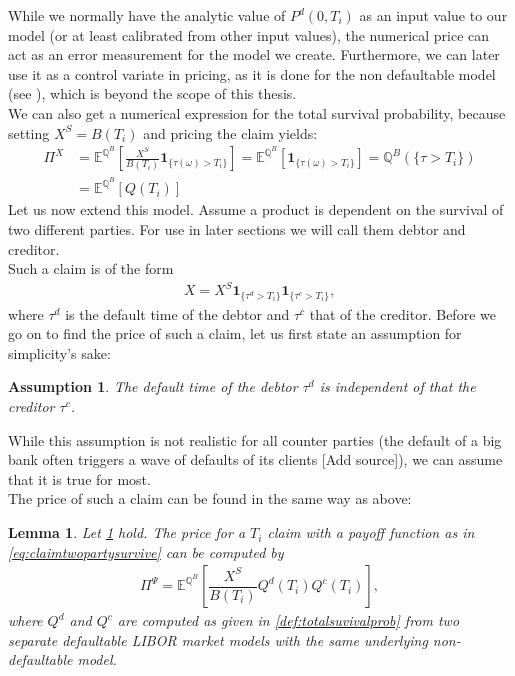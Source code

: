 \documentclass[12pt]{article}
\newtheorem{assumption}{Assumption}[section]
\newtheorem{lemma}[theorem]{Lemma}
\begin{document}
	While we normally have the analytic value of $P^d(0, T_i)$ as an input value to our model (or at least calibrated from other input values), the numerical price can act as an error measurement for the model we create. Furthermore, we can later use it as a control variate in pricing, as it is done for the non defaultable model (see \cite{FriesBook}), which is beyond the scope of this thesis.\\
	We can also get a numerical expression for the total survival probability, because setting
	$X^S = B(T_i)$ and pricing the claim yields:
	\begin{align*}
		\Pi^X &= \mathbb{E}^{\mathbb{Q}^B}\left[ \frac{X^S}{B(T_i)} \mathbf{1}_{\{\tau(\omega) > T_i\}}\right] = \mathbb{E}^{\mathbb{Q}^B}\left[ \mathbf{1}_{\{\tau(\omega) > T_i\}}\right]
		= \mathbb{Q}^B(\{\tau > T_i\})\\
		&= \mathbb{E}^{\mathbb{Q}^B}\left[ Q(T_i)\right]
	\end{align*}
	Let us now extend this model. Assume a product is dependent on the survival of two different parties. For use in later sections we will call them debtor and  creditor.\\
	Such a claim is of the form
	\begin{align}\label{eq:claimtwopartysurvive}
		X = X^S\mathbf{1}_{\{\tau^d > T_i\}}\mathbf{1}_{\{\tau^c > T_i\}},
	\end{align}
	where $\tau^d$ is the default time of the debtor and $\tau^c$ that of the creditor.
	Before we go on to find the price of such a claim, let us first state an assumption for simplicity's sake:
	\begin{assumption}\label{as:counterpartiesareindependent}
		The default time of the debtor $\tau^d$ is independent of that the creditor $\tau^c$.
	\end{assumption}
	While this assumption is not realistic for all counter parties (the default of a big bank often triggers a wave of defaults of its clients \color{red}[Add source]\color{black}), %
	we can assume that it is true for most.\\
	The price of such a claim can be found in the same way as above:
	\begin{lemma}\label{lem:creditordefPrice}
		Let \cref{as:counterpartiesareindependent} hold. The price for a $T_i$ claim with a payoff function as in \cref{eq:claimtwopartysurvive} can be computed by
		\begin{align*}
			\Pi^\Psi = \mathbb{E}^{\mathbb{Q}^B}\left[\dfrac{X^S}{B(T_i)}Q^d(T_i)Q^c(T_i)\right],
		\end{align*}
		where $Q^d$ and $Q^c$ are computed as given in \cref{def:totalsuvivalprob} from two separate defaultable LIBOR market models with the same underlying non-defaultable model.
	\end{lemma}
\end{document}
